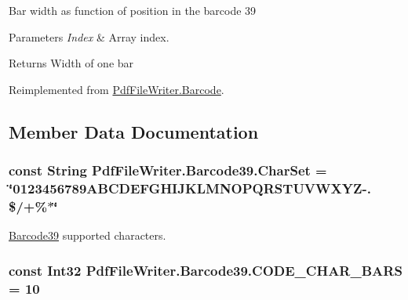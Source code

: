 Bar width as function of position in the barcode 39 


\begin{DoxyParams}{Parameters}
{\em Index} & Array index.\\
\hline
\end{DoxyParams}
\begin{DoxyReturn}{Returns}
Width of one bar
\end{DoxyReturn}


Reimplemented from \hyperlink{class_pdf_file_writer_1_1_barcode_adf11f62c74801b9d146c4eb430f7ba25}{Pdf\+File\+Writer.\+Barcode}.



\subsection{Member Data Documentation}
\subsubsection[{\texorpdfstring{Char\+Set}{CharSet}}]{\setlength{\rightskip}{0pt plus 5cm}const String Pdf\+File\+Writer.\+Barcode39.\+Char\+Set = \char`\"{}0123456789\+A\+B\+C\+D\+E\+F\+G\+H\+I\+J\+K\+L\+M\+N\+O\+P\+Q\+R\+S\+T\+U\+V\+W\+X\+Y\+Z-\/. \$/+\%$\ast$\char`\"{}}\hypertarget{class_pdf_file_writer_1_1_barcode39_a79a89513dba2fec56706df4bd7a009e1}{}\label{class_pdf_file_writer_1_1_barcode39_a79a89513dba2fec56706df4bd7a009e1}


\hyperlink{class_pdf_file_writer_1_1_barcode39}{Barcode39} supported characters. 

\subsubsection[{\texorpdfstring{C\+O\+D\+E\+\_\+\+C\+H\+A\+R\+\_\+\+B\+A\+RS}{CODE_CHAR_BARS}}]{\setlength{\rightskip}{0pt plus 5cm}const Int32 Pdf\+File\+Writer.\+Barcode39.\+C\+O\+D\+E\+\_\+\+C\+H\+A\+R\+\_\+\+B\+A\+RS = 10}\hypertarget{class_pdf_file_writer_1_1_barcode39_a707b4e705e1f5ffd2a1fb48fdde8421a}{}\label{class_pdf_file_writer_1_1_barcode39_a707b4e705e1f5ffd2a1fb48fdde8421a}


